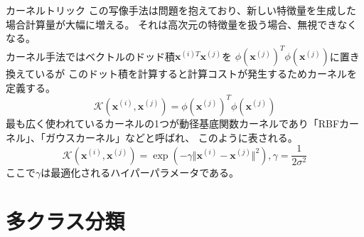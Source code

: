 \documentclass[aspectratio=169, dvipdfmx, 11pt]{beamer} %
\begin{document}
\begin{frame}{カーネルトリック}
    この写像手法は問題を抱えており、新しい特徴量を生成した場合計算量が大幅に増える。
    それは高次元の特徴量を扱う場合、無視できなくなる。\\
    カーネル手法ではベクトルのドッド積\(\textbf{x}^{(i)T}\textbf{x}^{(j)}\)を
    \(\phi(\textbf{x}^{(j)})^T \phi(\textbf{x}^{(j)})\)に置き換えているが
    このドット積を計算すると計算コストが発生するためカーネルを定義する。
    \begin{equation*}
        \mathcal{K} (\textbf{x}^{(i)}, \textbf{x}^{(j)}) = \phi(\textbf{x}^{(j)})^T \phi(\textbf{x}^{(j)})
    \end{equation*}
    最も広く使われているカーネルの1つが動径基底関数カーネルであり「RBFカーネル」、「ガウスカーネル」などと呼ばれ、
    このように表される。
    \begin{equation*}
        \mathcal{K} (\textbf{x}^{(i)}, \textbf{x}^{(j)}) 
        = \exp (-\gamma \Vert\textbf{x}^{(i)} - \textbf{x}^{(j)}\Vert^2), 
        \gamma = \frac{1}{2\sigma ^2}
    \end{equation*}
    ここで\(\gamma \)は最適化されるハイパーパラメータである。
\end{frame}

\section{多クラス分類}
\end{document}
